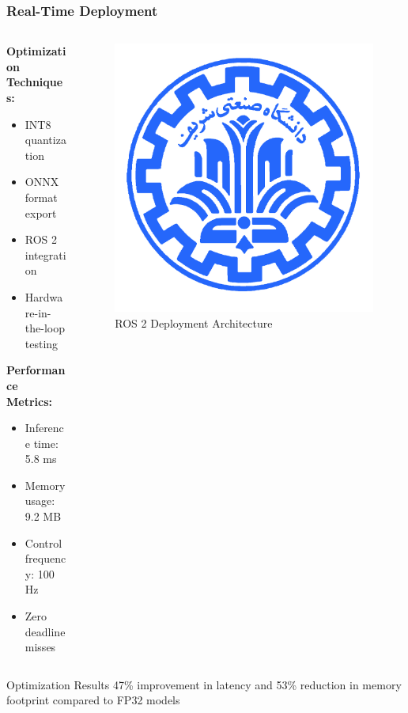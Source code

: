 \documentclass[
    11pt, %
    aspectratio=169, %
]{beamer}
\begin{document}
\begin{frame}
	\frametitle{Real-Time Deployment}
	
	\begin{columns}[t]
		\begin{column}{0.5\textwidth}
			\textbf{Optimization Techniques:}
			\begin{itemize}
				\item INT8 quantization
				\item ONNX format export
				\item ROS 2 integration
				\item Hardware-in-the-loop testing
			\end{itemize}
			
			\vspace{0.3cm}
			\textbf{Performance Metrics:}
			\begin{itemize}
				\item Inference time: 5.8 ms
				\item Memory usage: 9.2 MB
				\item Control frequency: 100 Hz
				\item Zero deadline misses
			\end{itemize}
		\end{column}
		\begin{column}{0.5\textwidth}
			\begin{figure}
				\centering
				\includegraphics[width=\textwidth]{deployment_architecture.png}
				\caption{ROS 2 Deployment Architecture}
			\end{figure}
		\end{column}
	\end{columns}
	
	\begin{block}{Optimization Results}
		47\% improvement in latency and 53\% reduction in memory footprint compared to FP32 models
	\end{block}
\end{frame}
\end{document}
